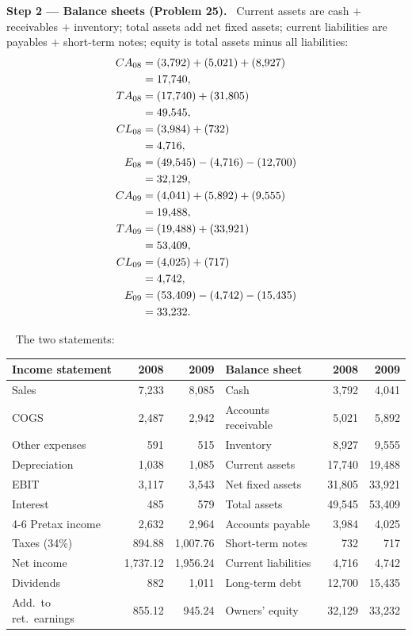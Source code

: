 \documentclass[11pt,a4paper]{article}
\newcommand{\step}[2]{\par\medskip\noindent\textbf{Step #1 --- #2.}~}
\newcommand{\answer}[1]{\par\smallskip\noindent\fbox{\textbf{Answer #1.}}~}
\begin{document}
\step{2}{Balance sheets (Problem 25)}
Current assets are cash $+$ receivables $+$ inventory; total assets add net fixed assets; current
liabilities are payables $+$ short-term notes; equity is total assets minus all liabilities:
\begin{align}
  CA_{08} &= (3{,}792) + (5{,}021) + (8{,}927) \notag\\
  &= 17{,}740, \notag\\
  TA_{08} &= (17{,}740) + (31{,}805) \notag\\
  &= 49{,}545, \notag\\
  CL_{08} &= (3{,}984) + (732) \notag\\
  &= 4{,}716, \notag\\
  E_{08} &= (49{,}545) - (4{,}716) - (12{,}700) \notag\\
  &= 32{,}129, \label{e15-e8}\\
  CA_{09} &= (4{,}041) + (5{,}892) + (9{,}555) \notag\\
  &= 19{,}488, \notag\\
  TA_{09} &= (19{,}488) + (33{,}921) \notag\\
  &= 53{,}409, \notag\\
  CL_{09} &= (4{,}025) + (717) \notag\\
  &= 4{,}742, \notag\\
  E_{09} &= (53{,}409) - (4{,}742) - (15{,}435) \notag\\
  &= 33{,}232. \label{e15-e9}
\end{align}

\answer{(25)} The two statements:

\begin{center}
\begin{tabular}{lrr@{\qquad}lrr}
\toprule
Income statement & 2008 & 2009 & Balance sheet & 2008 & 2009\\
\midrule
Sales & 7,233 & 8,085 & Cash & 3,792 & 4,041\\
COGS & 2,487 & 2,942 & Accounts receivable & 5,021 & 5,892\\
Other expenses & 591 & 515 & Inventory & 8,927 & 9,555\\
Depreciation & 1,038 & 1,085 & Current assets & 17,740 & 19,488\\
EBIT & 3,117 & 3,543 & Net fixed assets & 31,805 & 33,921\\
Interest & 485 & 579 & Total assets & 49,545 & 53,409\\
\cmidrule(lr){4-6}
Pretax income & 2,632 & 2,964 & Accounts payable & 3,984 & 4,025\\
Taxes (34\%) & 894.88 & 1,007.76 & Short-term notes & 732 & 717\\
Net income & 1,737.12 & 1,956.24 & Current liabilities & 4,716 & 4,742\\
Dividends & 882 & 1,011 & Long-term debt & 12,700 & 15,435\\
Add.\ to ret.\ earnings & 855.12 & 945.24 & Owners' equity & 32,129 & 33,232\\
\bottomrule
\end{tabular}
\end{center}
\end{document}
